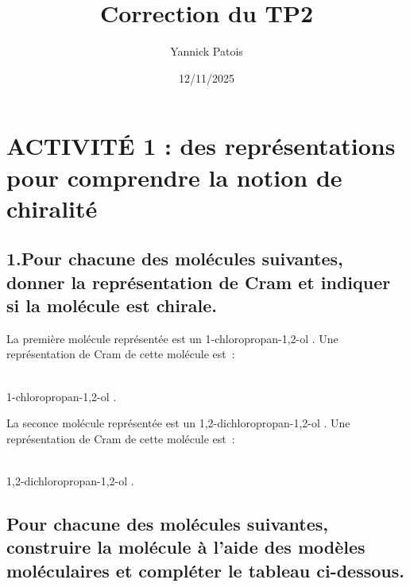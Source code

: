 \documentclass[a4paper,12pt]{article}
\title{Correction du TP2}
\author{Yannick Patois}
\date{12/11/2025}
\begin{document}
\maketitle

\section*{ACTIVITÉ 1 : des représentations pour comprendre la notion de chiralité}

\subsection*{1.Pour chacune des molécules suivantes, donner la représentation de Cram et indiquer si la molécule est chirale.}

La première molécule représentée est un 1-chloropropan-1,2-ol .
Une représentation de Cram de cette molécule est~:

\vfill
\begin{center}
    \\
    1-chloropropan-1,2-ol .
\end{center}
\vfill

La seconce molécule représentée est un 1,2-dichloropropan-1,2-ol .
Une représentation de Cram de cette molécule est~:

\vfill
\begin{center}
    \\
    1,2-dichloropropan-1,2-ol .
\end{center}
\vfill

\subsection*{Pour chacune des molécules suivantes, construire la molécule à l’aide des modèles moléculaires et compléter le
tableau ci-dessous.}
\end{document}
